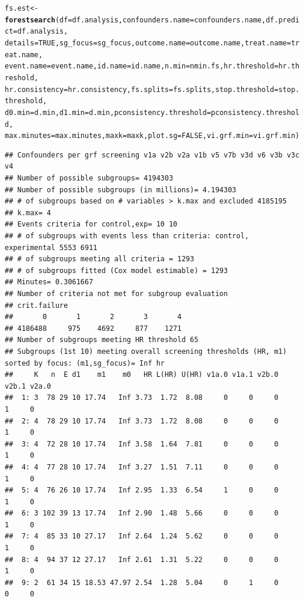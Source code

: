 \documentclass[9pt]{article}\usepackage[]{graphicx}\usepackage[]{xcolor}
\makeatletter
\newcommand{\hlnum}[1]{\textcolor[rgb]{0.686,0.059,0.569}{#1}}%
\newcommand{\hlstd}[1]{\textcolor[rgb]{0.345,0.345,0.345}{#1}}%
\newcommand{\hlkwb}[1]{\textcolor[rgb]{0.69,0.353,0.396}{#1}}%
\newcommand{\hlkwc}[1]{\textcolor[rgb]{0.333,0.667,0.333}{#1}}%
\newcommand{\hlkwd}[1]{\textcolor[rgb]{0.737,0.353,0.396}{\textbf{#1}}}%
\newenvironment{kframe}{%
 \def\at@end@of@kframe{}%
 \ifinner\ifhmode%
  \def\at@end@of@kframe{\end{minipage}}%
  \begin{minipage}{\columnwidth}%
 \fi\fi%
 \def\FrameCommand##1{\hskip\@totalleftmargin \hskip-\fboxsep
 \colorbox{shadecolor}{##1}\hskip-\fboxsep
     \hskip-\linewidth \hskip-\@totalleftmargin \hskip\columnwidth}%
 \MakeFramed {\advance\hsize-\width
   \@totalleftmargin\z@ \linewidth\hsize
   \@setminipage}}%
 {\par\unskip\endMakeFramed%
 \at@end@of@kframe}
\newenvironment{knitrout}{}{} %
\theoremstyle{definition}
\theoremstyle{remark}
\makeatother
\begin{document}
\begin{knitrout}
\begin{kframe}
\begin{alltt}
\hlstd{fs.est} \hlkwb{<-} \hlkwd{forestsearch}\hlstd{(}\hlkwc{df} \hlstd{= df.analysis,} \hlkwc{confounders.name} \hlstd{= confounders.name,} \hlkwc{df.predict} \hlstd{= df.analysis,}
    \hlkwc{details} \hlstd{=} \hlnum{TRUE}\hlstd{,} \hlkwc{sg_focus} \hlstd{= sg_focus,} \hlkwc{outcome.name} \hlstd{= outcome.name,} \hlkwc{treat.name} \hlstd{= treat.name,}
    \hlkwc{event.name} \hlstd{= event.name,} \hlkwc{id.name} \hlstd{= id.name,} \hlkwc{n.min} \hlstd{= nmin.fs,} \hlkwc{hr.threshold} \hlstd{= hr.threshold,}
    \hlkwc{hr.consistency} \hlstd{= hr.consistency,} \hlkwc{fs.splits} \hlstd{= fs.splits,} \hlkwc{stop.threshold} \hlstd{= stop.threshold,}
    \hlkwc{d0.min} \hlstd{= d.min,} \hlkwc{d1.min} \hlstd{= d.min,} \hlkwc{pconsistency.threshold} \hlstd{= pconsistency.threshold,}
    \hlkwc{max.minutes} \hlstd{= max.minutes,} \hlkwc{maxk} \hlstd{= maxk,} \hlkwc{plot.sg} \hlstd{=} \hlnum{FALSE}\hlstd{,} \hlkwc{vi.grf.min} \hlstd{= vi.grf.min)}
\end{alltt}
\begin{verbatim}
## Confounders per grf screening v1a v2b v2a v1b v5 v7b v3d v6 v3b v3c v4 
## Number of possible subgroups= 4194303 
## Number of possible subgroups (in millions)= 4.194303 
## # of subgroups based on # variables > k.max and excluded 4185195 
## k.max= 4 
## Events criteria for control,exp= 10 10 
## # of subgroups with events less than criteria: control, experimental 5553 6911 
## # of subgroups meeting all criteria = 1293 
## # of subgroups fitted (Cox model estimable) = 1293 
## Minutes= 0.3061667 
## Number of criteria not met for subgroup evaluation 
## crit.failure
##       0       1       2       3       4 
## 4186488     975    4692     877    1271 
## Number of subgroups meeting HR threshold 65 
## Subgroups (1st 10) meeting overall screening thresholds (HR, m1) sorted by focus: (m1,sg_focus)= Inf hr 
##     K   n  E d1    m1    m0   HR L(HR) U(HR) v1a.0 v1a.1 v2b.0 v2b.1 v2a.0
##  1: 3  78 29 10 17.74   Inf 3.73  1.72  8.08     0     0     0     1     0
##  2: 4  78 29 10 17.74   Inf 3.73  1.72  8.08     0     0     0     1     0
##  3: 4  72 28 10 17.74   Inf 3.58  1.64  7.81     0     0     0     1     0
##  4: 4  77 28 10 17.74   Inf 3.27  1.51  7.11     0     0     0     1     0
##  5: 4  76 26 10 17.74   Inf 2.95  1.33  6.54     1     0     0     1     0
##  6: 3 102 39 13 17.74   Inf 2.90  1.48  5.66     0     0     0     1     0
##  7: 4  85 33 10 27.17   Inf 2.64  1.24  5.62     0     0     0     1     0
##  8: 4  94 37 12 27.17   Inf 2.61  1.31  5.22     0     0     0     1     0
##  9: 2  61 34 15 18.53 47.97 2.54  1.28  5.04     0     1     0     0     0

\end{verbatim}
\end{kframe}
\end{knitrout}
\end{document}
